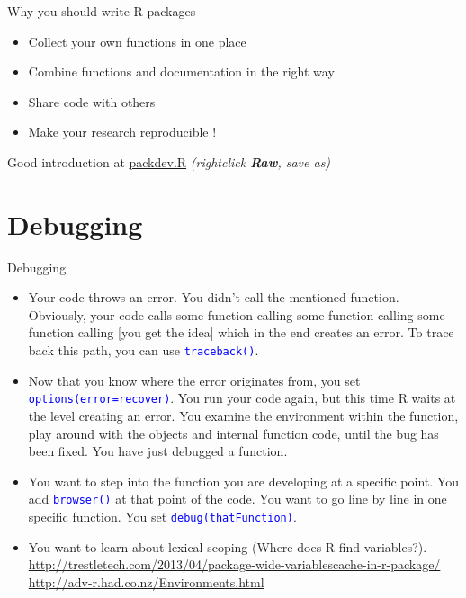 \documentclass[xcolor=table,      handout ,    xcolor=dvipsnames]{beamer}\usepackage[]{graphicx}\usepackage[]{color}
\newcommand{\rcode}[1]{\texttt{\textcolor{Blue}{#1}}}
\newcommand{\datalinkText}[1]{\href{https://github.com/brry/course/blob/master/data/#1}{#1} 
                            {\footnotesize \textit{(rightclick \textbf{Raw}, save as)}}}
\begin{document}

\begin{frame}{Why you should write R packages}
\pause
\begin{itemize}[<+->]
\item Collect your own functions in one place
\item Combine functions and documentation in the right way
\item Share code with others
\item Make your research reproducible !
\end{itemize}
\onslide<+->
\vspace{1em}
Good introduction at \datalinkText{packdev.R}
\end{frame}



\section{Debugging}


\begin{frame}[fragile]{Debugging}
\begin{itemize}[<+->]
\item Your code throws an error.
You didn't call the mentioned function.
Obviously, your code calls some function calling some function calling some function calling [you get the idea] which in the end creates an error.
To trace back this path, you can use \rcode{traceback()}.

\item Now that you know where the error originates from, you set \rcode{options(error=recover)}.
You run your code again, but this time R waits at the level creating an error.
You examine the environment within the function, play around with the objects and internal function code, until the bug has been fixed.
You have just debugged a function.

\item You want to step into the function you are developing at a specific point.
You add \rcode{browser()} at that point of the code.
You want to go line by line in one specific function. You set \rcode{debug(thatFunction)}.

\item You want to learn about lexical scoping (Where does R find variables?).\\
\small
\href{http://trestletech.com/2013/04/package-wide-variablescache-in-r-package/}{http://trestletech.com/2013/04/package-wide-variablescache-in-r-package/}
\href{http://adv-r.had.co.nz/Environments.html}{http://adv-r.had.co.nz/Environments.html}
\end{itemize}
\end{frame}
\end{document}
